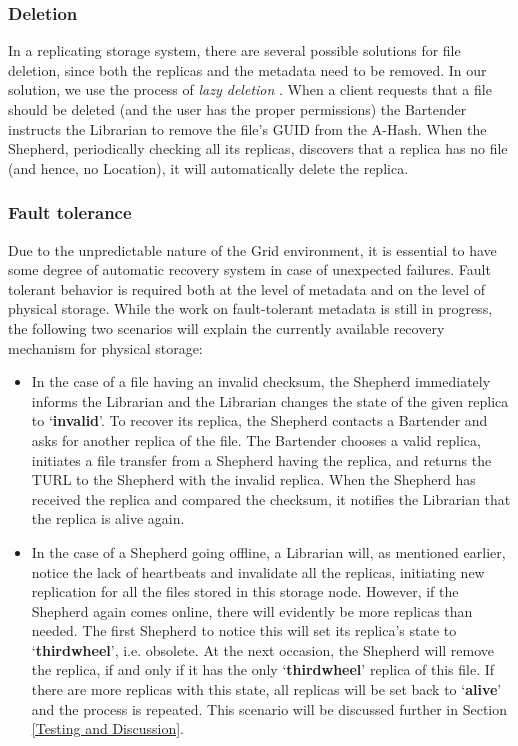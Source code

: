 \documentclass[final]{ieee}
\begin{document}
\subsubsection{Deletion}
\label{Deletion}
In a replicating storage system, there are several possible solutions
for file deletion, since both the replicas and the metadata need to be
removed. In our solution, we use the process of \textit{lazy
  deletion} \cite{LazyDeletion}. When a client requests that a file
should be deleted (and the user has the proper permissions) the
Bartender instructs the Librarian to remove the file's GUID from the
A-Hash. When the Shepherd, periodically checking all its replicas,
discovers that a replica has no file (and hence, no Location), it will
automatically delete the replica.

\subsubsection{Fault tolerance}
\label{Fault tolerance}

Due to the unpredictable nature of the Grid environment, it is essential to
have some degree of  automatic recovery system in case of unexpected
failures. Fault tolerant behavior is required both at the level of
metadata and on the level of physical storage. While the work on fault-tolerant metadata is still in
progress, the following two
scenarios will explain the currently available recovery mechanism for
physical storage: 
\begin{itemize}
\item In the case of a file having an invalid checksum, the Shepherd
immediately informs the Librarian and the Librarian changes the state of the given replica to
`\textbf{invalid}'. To recover its replica, the Shepherd contacts a
Bartender and asks for another replica of the file. The Bartender chooses a valid
replica, initiates a file transfer from a Shepherd having the replica,
and returns the TURL to the Shepherd with the invalid replica. When the
Shepherd has received the replica and compared the checksum, it notifies the
Librarian that the replica is alive again.  
\item In the case of a Shepherd going offline, a Librarian will,
  as mentioned earlier, notice the lack of heartbeats and invalidate all the
  replicas, initiating new replication for all the files stored in
  this storage node. However, if the Shepherd
  again comes online, there will evidently be more replicas than
  needed. The first Shepherd to notice this will set its replica's
  state to `\textbf{thirdwheel}', i.e. obsolete. At the next occasion,
  the Shepherd will remove the replica, if and only if it has the only
  `\textbf{thirdwheel}' replica of this file. If there are more
  replicas with this state, all replicas will be set back to
  `\textbf{alive}' and the process is repeated. This scenario will be discussed further in Section
  \ref{Testing and Discussion}.
\end{itemize}
\end{document}
